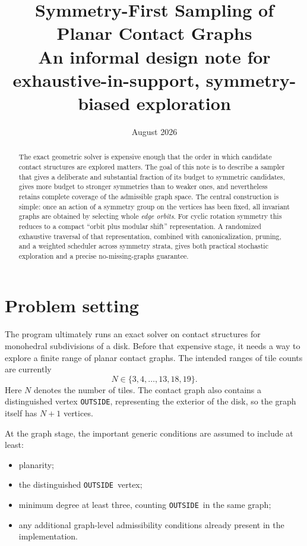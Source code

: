 \documentclass[11pt]{article}
\title{\textbf{Symmetry-First Sampling of Planar Contact Graphs}\\
\large An informal design note for exhaustive-in-support, symmetry-biased exploration}
\author{}
\date{August 2026}
\newcommand{\OUT}{\texttt{OUTSIDE}}
\begin{document}
\maketitle

\begin{abstract}
The exact geometric solver is expensive enough that the order in which candidate contact structures are explored matters. The goal of this note is to describe a sampler that gives a deliberate and substantial fraction of its budget to symmetric candidates, gives more budget to stronger symmetries than to weaker ones, and nevertheless retains complete coverage of the admissible graph space. The central construction is simple: once an action of a symmetry group on the vertices has been fixed, all invariant graphs are obtained by selecting whole \emph{edge orbits}. For cyclic rotation symmetry this reduces to a compact ``orbit plus modular shift'' representation. A randomized exhaustive traversal of that representation, combined with canonicalization, pruning, and a weighted scheduler across symmetry strata, gives both practical stochastic exploration and a precise no-missing-graphs guarantee.
\end{abstract}

{\small\tableofcontents}
\newpage

\section{Problem setting}

The program ultimately runs an exact solver on contact structures for monohedral subdivisions of a disk. Before that expensive stage, it needs a way to explore a finite range of planar contact graphs. The intended ranges of tile counts are currently
\[
N\in\{3,4,\ldots,13,18,19\}.
\]
Here \(N\) denotes the number of tiles. The contact graph also contains a distinguished vertex \OUT, representing the exterior of the disk, so the graph itself has \(N+1\) vertices.

At the graph stage, the important generic conditions are assumed to include at least:
\begin{itemize}
  \item planarity;
  \item the distinguished \OUT\ vertex;
  \item minimum degree at least three, counting \OUT\ in the same graph;
  \item any additional graph-level admissibility conditions already present in the implementation.
\end{itemize}
\end{document}
